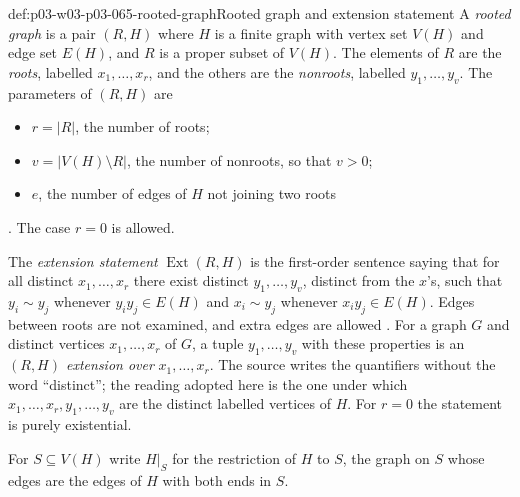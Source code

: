 \begin{hbdefinition}{def:p03-w03-p03-065-rooted-graph}{Rooted graph and extension statement}
A \emph{rooted graph} is a pair \((R,H)\) where \(H\) is a finite graph with
vertex set \(V(H)\) and edge set \(E(H)\), and \(R\) is a proper subset of
\(V(H)\).  The elements of \(R\) are the \emph{roots}, labelled
\(x_1,\ldots,x_r\), and the others are the \emph{nonroots}, labelled
\(y_1,\ldots,y_v\).  The parameters of \((R,H)\) are
\begin{itemize}
\item \(r=|R|\), the number of roots;
\item \(v=|V(H)\setminus R|\), the number of nonroots, so that \(v>0\);
\item \(e\), the number of edges of \(H\) not joining two roots
\end{itemize}
\cite[p.~6]{Spencer2007LogicRandomStructuresAuthor}.  The case \(r=0\) is allowed.

The \emph{extension statement} \(\operatorname{Ext}(R,H)\) is the
first-order sentence saying that for all distinct \(x_1,\ldots,x_r\) there
exist distinct \(y_1,\ldots,y_v\), distinct from the \(x\)'s, such that
\(y_i\sim y_j\) whenever \(y_iy_j\in E(H)\) and \(x_i\sim y_j\) whenever
\(x_iy_j\in E(H)\).  Edges between roots are not examined, and extra edges are
allowed \cite[p.~6]{Spencer2007LogicRandomStructuresAuthor}.  For a graph \(G\) and distinct
vertices \(x_1,\ldots,x_r\) of \(G\), a tuple \(y_1,\ldots,y_v\) with these
properties is an \emph{\((R,H)\) extension over} \(x_1,\ldots,x_r\).  The
source writes the quantifiers without the word ``distinct''; the reading
adopted here is the one under which \(x_1,\ldots,x_r,y_1,\ldots,y_v\) are
the distinct labelled vertices of \(H\).  For \(r=0\) the statement is purely
existential.
\end{hbdefinition}

For \(S\subseteq V(H)\) write \(H|_S\) for the restriction of \(H\) to \(S\),
the graph on \(S\) whose edges are the edges of \(H\) with both ends in \(S\).

